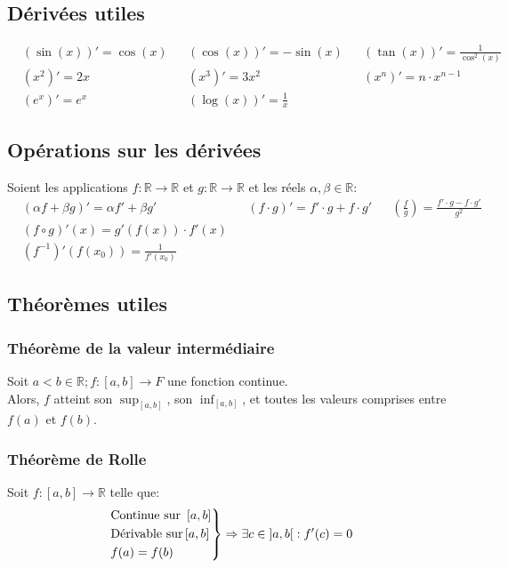 \documentclass{article}
\numberwithin{equation}{section}
\begin{document}
\subsection{Dérivées utiles}
\begin{align*}
	&(\sin(x))' = \cos(x)
		& &(\cos(x))' = -\sin(x)
			& &(\tan(x))' = \frac{1}{\cos^2(x)} \\
	&(x^2)' = 2x
		& &(x^3)' = 3x^2
			& &(x^n)' = n \cdot x^{n-1} \\
	&(e^x)' = e^x
		& &(\log(x))' = \frac{1}{x}
\end{align*}

\subsection{Opérations sur les dérivées}
Soient les applications \(f: \mathbb{R} \to \mathbb{R}\) et \(g: \mathbb{R} \to \mathbb{R}\) et les réels \(\alpha, \beta \in \mathbb{R}\):
\begin{align*}
	&(\alpha f + \beta g)' = \alpha f' + \beta g' 
		& &(f \cdot g)' = f' \cdot g + f \cdot g' 
			& &\left (\frac{f}{g}\right ) = \frac{f' \cdot g - f \cdot g'}{g^2} \\ 
	&(f \circ g)'(x) = g'(f(x)) \cdot f'(x) \\
	&(f^{-1})' (f(x_0))  = \frac{1}{f'(x_0)} %
\end{align*}

\subsection{Théorèmes utiles} %

\subsubsection{Théorème de la valeur intermédiaire}
Soit \(a < b \in \mathbb{R}; f : \left [a, b \right ] \to F\) une fonction continue. \\
Alors, \(f\) atteint son \(\sup_{\left [a, b \right ]}\), son \(\inf_{\left [a, b \right ]}\), et toutes les valeurs comprises entre \(f(a)\) et \(f(b)\).

\subsubsection{Théorème de Rolle}
Soit \(f : \left [a, b \right ] \to \mathbb{R}\) telle que:
\begin{equation*}
	\begin{rcases}
		\text{Continue sur } \left [a, b \right ] \\
		\text{Dérivable sur} \left [a, b \right ] \\
		f(a) = f(b)
	\end{rcases}
	\Rightarrow \exists c \in \left ]a, b \right [ : f'(c) = 0
\end{equation*}
\end{document}
